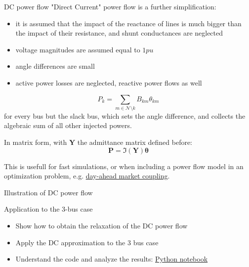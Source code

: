 \begin{frame}[allowframebreaks]{DC power flow}
    "Direct Current" power flow is a further simplification:
    \begin{itemize}
        \item it is assumed that the impact of the reactance of lines is much bigger than the impact of their resistance, and shunt conductances are neglected
        \item voltage magnitudes are assumed equal to $1 pu$
        \item angle differences are small
        \item active power losses are neglected, reactive power flows as well
    \end{itemize}
    
    $$P_k =  \sum_{m \in \mathcal{N} \setminus k} B_{km} \theta_{km}$$
    for every bus but the slack bus, which sets the angle difference, and collects the algebraic sum of all other injected powers.
    
    In matrix form, with $\mathbf{Y}$ the admittance matrix defined before:
    $$\mathbf{P} =  \Im(\mathbf{Y}) \mathbf{\theta}$$
    
    This is usefull for fast simulations, or when including a power flow model in an optimization problem, e.g. \href{https://bcornelusse.github.io/material/CoursEM20170331.pdf}{day-ahead market coupling}.
\end{frame}

\begin{frame}{Illustration of DC power flow}
    \begin{block}{Application to the 3-bus case}
        \begin{itemize}
            \item Show how to obtain the relaxation of the DC power flow
            \item Apply the DC approximation to the 3 bus case
            \item Understand the code and analyze the results: \href{https://github.com/bcornelusse/ELEC0447-analysis-power-systems/tree/master/notebooks/power_flow_3-bus_DC.ipynb}{\underline{Python notebook}}    
        \end{itemize}
    \end{block}
    
\end{frame}


